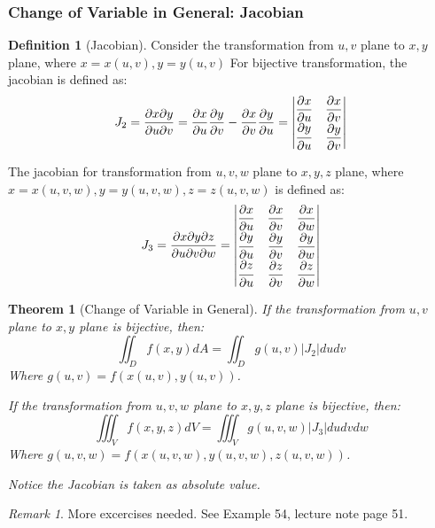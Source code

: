\documentclass[12pt,a4paper]{article}
\newtheorem{theorem}{Theorem}[subsection]
\theoremstyle{definition}
\newtheorem{definition}{Definition}[section]
\theoremstyle{remark}
\newtheorem{remark}{Remark}[section]
\begin{document}
\subsubsection{Change of Variable in General: Jacobian}
\begin{definition}[Jacobian]
Consider the transformation from $u,v$ plane to $x,y$ plane, where $x = x(u,v), y = y(u, v)$ For bijective transformation, the jacobian is defined as:
	\[
		J_2 = \frac{\partial x \partial y}{\partial u \partial v} 
		= \frac{\partial x}{\partial u} \frac{\partial y}{\partial v} - \frac{\partial x}{\partial v} \frac{\partial y}{\partial u}
		=\begin{vmatrix}
			\dfrac{\partial x}{\partial u} & \dfrac{\partial x}{\partial v} \\
			\dfrac{\strut\partial y}{\partial u} & \dfrac{\partial y}{\partial v}
		\end{vmatrix}
	\]

The jacobian for transformation from $u,v,w$ plane to $x,y,z$ plane, where $x=x(u,v,w), y = y(u,v,w), z = z(u,v,w)$ is defined as:
\[
	J_3 = \frac{\partial x \partial y \partial z}{\partial u \partial v \partial w}
=	\begin{vmatrix}
		\dfrac{\partial x}{\partial u} & \dfrac{\partial x}{\partial v} & \dfrac{\partial x}{\partial w} \\
		\dfrac{\strut\partial y}{\partial u} & \dfrac{\partial y}{\partial v} & \dfrac{\partial y}{\partial w} \\
		\dfrac{\strut\partial z}{\partial u} & \dfrac{\partial z}{\partial v} & \dfrac{\partial z}{\partial w}
	\end{vmatrix}
\]
\end{definition}

\begin{theorem}[Change of Variable in General]
If the transformation from $u,v$ plane to $x,y$ plane is bijective, then:
\[
	\iint_D f(x,y) dA = \iint_D g(u,v) |J_2| du dv
\]
Where $g(u,v) = f(x(u,v), y(u,v))$.

If the transformation from $u,v,w$ plane to $x,y,z$ plane is bijective, then:
\[
	\iiint_V f(x,y,z) dV = \iiint_V g(u,v,w) |J_3| du dv dw
\]
Where $g(u,v,w) = f(x(u,v,w), y(u,v,w), z(u,v,w))$.

Notice the Jacobian is taken as absolute value.
\end{theorem}

\begin{remark}
	More excercises needed. See Example 54, lecture note page 51.
\end{remark}
\end{document}
